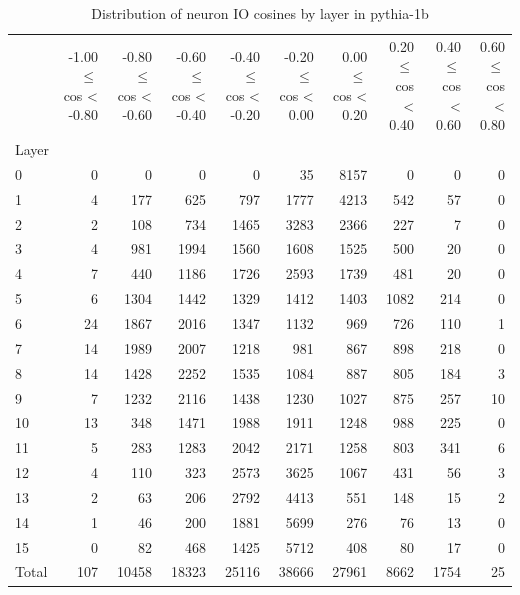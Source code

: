 \begin{table}
\caption{Distribution of neuron IO cosines by layer in pythia-1b}
\label{tab:pythia-1b_half_coarse}
\begin{tabular}{lrrrrrrrrr}
 & -1.00 $\leq$ cos < -0.80 & -0.80 $\leq$ cos < -0.60 & -0.60 $\leq$ cos < -0.40 & -0.40 $\leq$ cos < -0.20 & -0.20 $\leq$ cos < 0.00 & 0.00 $\leq$ cos < 0.20 & 0.20 $\leq$ cos < 0.40 & 0.40 $\leq$ cos < 0.60 & 0.60 $\leq$ cos < 0.80 \\
Layer &  &  &  &  &  &  &  &  &  \\
0 & 0 & 0 & 0 & 0 & 35 & 8157 & 0 & 0 & 0 \\
1 & 4 & 177 & 625 & 797 & 1777 & 4213 & 542 & 57 & 0 \\
2 & 2 & 108 & 734 & 1465 & 3283 & 2366 & 227 & 7 & 0 \\
3 & 4 & 981 & 1994 & 1560 & 1608 & 1525 & 500 & 20 & 0 \\
4 & 7 & 440 & 1186 & 1726 & 2593 & 1739 & 481 & 20 & 0 \\
5 & 6 & 1304 & 1442 & 1329 & 1412 & 1403 & 1082 & 214 & 0 \\
6 & 24 & 1867 & 2016 & 1347 & 1132 & 969 & 726 & 110 & 1 \\
7 & 14 & 1989 & 2007 & 1218 & 981 & 867 & 898 & 218 & 0 \\
8 & 14 & 1428 & 2252 & 1535 & 1084 & 887 & 805 & 184 & 3 \\
9 & 7 & 1232 & 2116 & 1438 & 1230 & 1027 & 875 & 257 & 10 \\
10 & 13 & 348 & 1471 & 1988 & 1911 & 1248 & 988 & 225 & 0 \\
11 & 5 & 283 & 1283 & 2042 & 2171 & 1258 & 803 & 341 & 6 \\
12 & 4 & 110 & 323 & 2573 & 3625 & 1067 & 431 & 56 & 3 \\
13 & 2 & 63 & 206 & 2792 & 4413 & 551 & 148 & 15 & 2 \\
14 & 1 & 46 & 200 & 1881 & 5699 & 276 & 76 & 13 & 0 \\
15 & 0 & 82 & 468 & 1425 & 5712 & 408 & 80 & 17 & 0 \\
Total & 107 & 10458 & 18323 & 25116 & 38666 & 27961 & 8662 & 1754 & 25 \\
\end{tabular}
\end{table}
